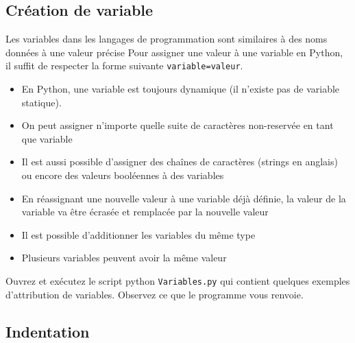 \subsection{Création de variable}

Les variables dans les langages de programmation sont similaires à des noms données à une valeur précise
Pour assigner une valeur à une variable en Python, il suffit de respecter la forme suivante \lstinline{variable=valeur}.

\begin{conseil}
\begin{itemize}
	\item En Python, une variable est  toujours dynamique (il n'existe pas de variable statique).
	\item On peut assigner n'importe quelle suite de caractères non-reservée en tant que variable
	\item Il est aussi possible d'assigner des chaînes de caractères (strings en anglais) ou encore des valeurs booléennes à des variables
	\item En réassignant une nouvelle valeur à une variable déjà définie, la valeur de la variable va être écrasée et remplacée par la nouvelle valeur
	\item Il est possible d'additionner les variables du même type
	\item Plusieurs variables peuvent avoir la même valeur
\end{itemize}
\end{conseil}

\begin{Exercice}[5 minutes]

Ouvrez et exécutez le script python \lstinline{Variables.py} qui contient quelques exemples d'attribution de variables. Observez ce que le programme vous renvoie.

\end{Exercice}


\subsection{Indentation}

